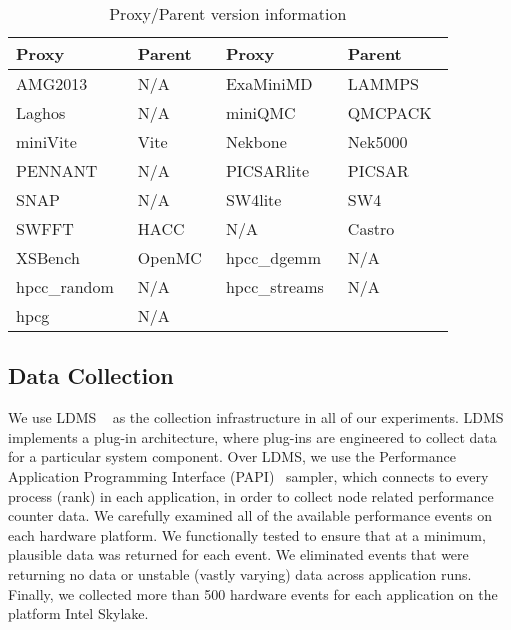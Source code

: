 \begin{table}[!t]
\caption{Proxy/Parent version information}
\label{tab:version}
\centering
\begin{tabular}{ll|ll}
\toprule
\textbf{Proxy} & \textbf{Parent} & \textbf{Proxy} & \textbf{Parent}  \\ 
\midrule
AMG2013~\cite{AMG}      &  \cellcolor{Gray!50}N/A        & ExaMiniMD~\cite{ostiExaMiniMD}      &  \cellcolor{Gray!50}LAMMPS~\cite{LAMMPS}    \\
Laghos~\cite{Laghos}         & \cellcolor{Gray!50}N/A        & miniQMC~\cite{richards2018fy18}         & \cellcolor{Gray!50}QMCPACK~\cite{qmcpack}   \\
miniVite~\cite{miniVite}       & \cellcolor{Gray!50}Vite~\cite{Vite}       &  Nekbone        & \cellcolor{Gray!50}Nek5000~\cite{Nek5000}     \\
PENNANT         & \cellcolor{Gray!50}N/A      & PICSARlite      &\cellcolor{Gray!50}PICSAR~\cite{PICSAR}       \\
SNAP            & \cellcolor{Gray!50}N/A       & SW4lite ~\cite{ECPProxySuite1}        & \cellcolor{Gray!50}SW4~\cite{SW42}       \\
SWFFT~\cite{ECPProxySuite1}          & \cellcolor{Gray!50}HACC~\cite{HACC}      & N/A            &\cellcolor{Gray!50}Castro~\cite{Castro}      \\
XSBench~\cite{XSBench}        & \cellcolor{Gray!50}OpenMC~\cite{OpenMC}    & hpcc\_dgemm~\cite{hpcc}   & \cellcolor{Gray!50}N/A        \\
hpcc\_random~\cite{hpcc}    & \cellcolor{Gray!50}N/A        & hpcc\_streams~\cite{hpcc}   &\cellcolor{Gray!50}N/A       \\
hpcg ~\cite{hpcg}          & \cellcolor{Gray!50}N/A           \\ 
\bottomrule
\end{tabular}
\end{table}
\subsection{Data Collection}
\label{sec:collect}
We use LDMS ~\cite{ldms_sandia} as the collection infrastructure in all of our experiments. LDMS implements a plug-in architecture, where plug-ins are  engineered to collect data for a particular system component. Over LDMS, we use the Performance Application Programming Interface (PAPI)~\cite{terpstra2010collecting} sampler, which %
connects to every process (rank) in each application, in order to collect node related performance counter data. We carefully examined all of the available performance events on each hardware platform. We functionally tested to ensure that at a minimum, plausible data was returned for each event. We eliminated events that were returning no data or unstable (\ie vastly varying) data across application runs. Finally, we collected more than 500 hardware events for each application on the platform Intel Skylake. 

